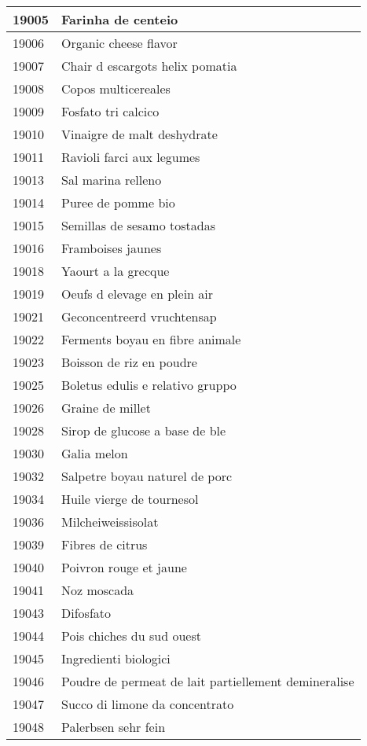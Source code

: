 \begin{longtable}{|l|l|}
19005 & Farinha de centeio \\ \hline 
19006 & Organic cheese flavor \\ \hline 
19007 & Chair d escargots helix pomatia \\ \hline 
19008 & Copos multicereales \\ \hline 
19009 & Fosfato tri calcico \\ \hline 
19010 & Vinaigre de malt deshydrate \\ \hline 
19011 & Ravioli farci aux legumes \\ \hline 
19013 & Sal marina relleno \\ \hline 
19014 & Puree de pomme bio \\ \hline 
19015 & Semillas de sesamo tostadas \\ \hline 
19016 & Framboises jaunes \\ \hline 
19018 & Yaourt a la grecque \\ \hline 
19019 & Oeufs d elevage en plein air \\ \hline 
19021 & Geconcentreerd vruchtensap \\ \hline 
19022 & Ferments boyau en fibre animale \\ \hline 
19023 & Boisson de riz en poudre \\ \hline 
19025 & Boletus edulis e relativo gruppo \\ \hline 
19026 & Graine de millet \\ \hline 
19028 & Sirop de glucose a base de ble \\ \hline 
19030 & Galia melon \\ \hline 
19032 & Salpetre boyau naturel de porc \\ \hline 
19034 & Huile vierge de tournesol \\ \hline 
19036 & Milcheiweissisolat \\ \hline 
19039 & Fibres de citrus \\ \hline 
19040 & Poivron rouge et jaune \\ \hline 
19041 & Noz moscada \\ \hline 
19043 & Difosfato \\ \hline 
19044 & Pois chiches du sud ouest \\ \hline 
19045 & Ingredienti biologici \\ \hline 
19046 & Poudre de permeat de lait partiellement demineralise \\ \hline 
19047 & Succo di limone da concentrato \\ \hline 
19048 & Palerbsen sehr fein \\ \hline 

\end{longtable}
